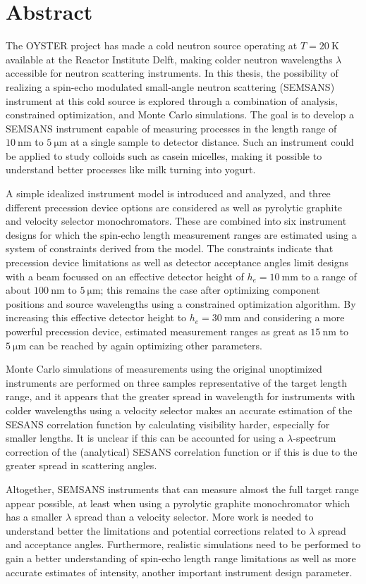 \chapter*{Abstract}

The OYSTER project has made a cold neutron source operating at $T = \SI{20}{\kelvin}$ available at the Reactor Institute Delft, making colder neutron wavelengths $\lambda$ accessible for neutron scattering instruments. In this thesis, the possibility of realizing a spin-echo modulated small-angle neutron scattering (SEMSANS) instrument at this cold source is explored through a combination of analysis, constrained optimization, and Monte Carlo simulations. The goal is to develop a SEMSANS instrument capable of measuring processes in the length range of $\SI{10}{\nano\meter}$ to $\SI{5}{\micro\meter}$ at a single sample to detector distance. Such an instrument could be applied to study colloids such as casein micelles, making it possible to understand better processes like milk turning into yogurt. 

A simple idealized instrument model is introduced and analyzed, and three different precession device options are considered as well as pyrolytic graphite and velocity selector monochromators. These are combined into six instrument designs for which the spin-echo length measurement ranges are estimated using a system of constraints derived from the model. The constraints indicate that precession device limitations as well as detector acceptance angles limit designs with a beam focussed on an effective detector height of $h_e = \SI{10}{\milli\meter}$ to a range of about  $\SI{100}{\nano\meter}$ to $\SI{5}{\micro\meter}$; this remains the case after optimizing component positions and source wavelengths using a constrained optimization algorithm. By increasing this effective detector height to $h_e = \SI{30}{\milli\meter}$ and considering a more powerful precession device, estimated measurement ranges as great as $\SI{15}{\nano\meter}$ to $\SI{5}{\micro\meter}$ can be reached by again optimizing other parameters.

Monte Carlo simulations of measurements using the original unoptimized instruments are performed on three samples representative of the target length range, and it appears that the greater spread in wavelength for instruments with colder wavelengths using a velocity selector makes an accurate estimation of the SESANS correlation function by calculating visibility harder, especially for smaller lengths. It is unclear if this can be accounted for using a $\lambda$-spectrum correction of the (analytical) SESANS correlation function or if this is due to the greater spread in scattering angles.

Altogether, SEMSANS instruments that can measure almost the full target range appear possible, at least when using a pyrolytic graphite monochromator which has a smaller $\lambda$ spread than a velocity selector. More work is needed to understand better the limitations and potential corrections related to $\lambda$ spread and acceptance angles. Furthermore, realistic simulations need to be performed to gain a better understanding of spin-echo length range limitations as well as more accurate estimates of intensity, another important instrument design parameter.
